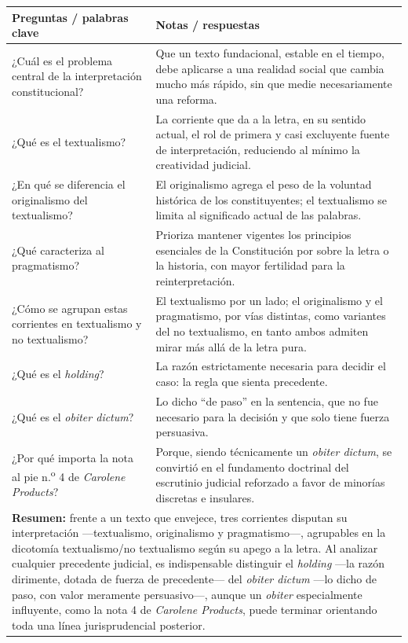\documentclass[12pt,oneside]{book}
\begin{document}
\begin{longtable}{@{}p{}p{}@{}}
\toprule
\textbf{Preguntas / palabras clave} & \textbf{Notas / respuestas} \\
\midrule
\endhead
¿Cuál es el problema central de la interpretación constitucional? &
Que un texto fundacional, estable en el tiempo, debe aplicarse a una realidad
social que cambia mucho más rápido, sin que medie necesariamente una reforma. \\
¿Qué es el textualismo? & La corriente que da a la letra, en su sentido actual,
el rol de primera y casi excluyente fuente de interpretación, reduciendo al mínimo
la creatividad judicial. \\
¿En qué se diferencia el originalismo del textualismo? & El originalismo agrega el
peso de la voluntad histórica de los constituyentes; el textualismo se limita al
significado actual de las palabras. \\
¿Qué caracteriza al pragmatismo? & Prioriza mantener vigentes los principios
esenciales de la Constitución por sobre la letra o la historia, con mayor
fertilidad para la reinterpretación. \\
¿Cómo se agrupan estas corrientes en textualismo y no textualismo? & El
textualismo por un lado; el originalismo y el pragmatismo, por vías distintas,
como variantes del no textualismo, en tanto ambos admiten mirar más allá de la
letra pura. \\
¿Qué es el \textit{holding}? & La razón estrictamente necesaria para decidir el
caso: la regla que sienta precedente. \\
¿Qué es el \textit{obiter dictum}? & Lo dicho ``de paso'' en la sentencia, que no
fue necesario para la decisión y que solo tiene fuerza persuasiva. \\
¿Por qué importa la nota al pie n.\textsuperscript{o} 4 de \textit{Carolene
Products}? & Porque, siendo técnicamente un \textit{obiter dictum}, se convirtió en
el fundamento doctrinal del escrutinio judicial reforzado a favor de minorías
discretas e insulares. \\
\midrule
\multicolumn{2}{p{0.95\textwidth}}{\textbf{Resumen:} frente a un texto que
envejece, tres corrientes disputan su interpretación —textualismo, originalismo y
pragmatismo—, agrupables en la dicotomía textualismo/no textualismo según su apego
a la letra. Al analizar cualquier precedente judicial, es indispensable distinguir
el \textit{holding} —la razón dirimente, dotada de fuerza de precedente— del
\textit{obiter dictum} —lo dicho de paso, con valor meramente persuasivo—, aunque
un \textit{obiter} especialmente influyente, como la nota 4 de \textit{Carolene
Products}, puede terminar orientando toda una línea jurisprudencial posterior.} \\
\bottomrule
\end{longtable}
\end{document}

